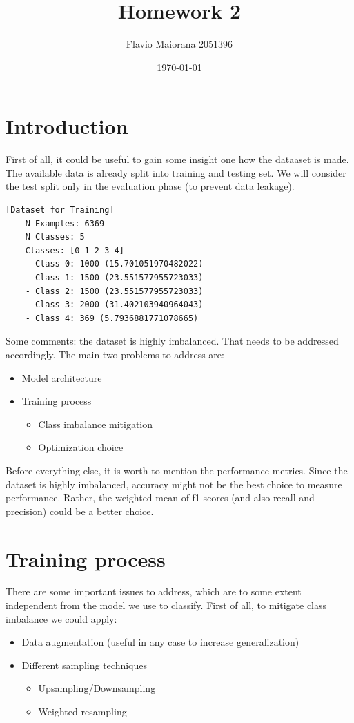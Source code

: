 \documentclass[12pt,a4paper,oneside]{article}
\title{Homework 2}	                                    %
\author{Flavio Maiorana 2051396}				        %
\date{\today}								            %
\begin{document}

\newpage

\section{Introduction}

First of all, it could be useful to gain some insight one how the dataaset is
made. The available data is already split into training and testing set. We
will consider the test split only in the evaluation phase (to prevent
data leakage).

\begin{verbatim}[Dataset for Training]
    N Examples: 6369
    N Classes: 5
    Classes: [0 1 2 3 4]
    - Class 0: 1000 (15.701051970482022)
    - Class 1: 1500 (23.551577955723033)
    - Class 2: 1500 (23.551577955723033)
    - Class 3: 2000 (31.402103940964043)
    - Class 4: 369 (5.7936881771078665)
\end{verbatim}

Some comments: the dataset is highly imbalanced. That needs to be addressed
accordingly. The main two problems to address are:

\begin{itemize}
    \item Model architecture
    \item Training process
    \begin{itemize}
        \item Class imbalance mitigation
        \item Optimization choice
    \end{itemize}
\end{itemize}

Before everything else, it is worth to mention the performance metrics. Since
the dataset is highly imbalanced, accuracy might not be the best choice to
measure performance. Rather, the weighted mean of f1-scores (and also recall and
precision) could be a better choice. 

\section{Training process}

There are some important issues to address, which are to some extent independent
from the model we use to classify. First of all, to mitigate class imbalance we
could apply:
\begin{itemize}
    \item Data augmentation (useful in any case to increase generalization)
    \item Different sampling techniques
    \begin{itemize}
        \item Upsampling/Downsampling
        \item Weighted resampling
    \end{itemize}
\end{itemize}
\end{document}
